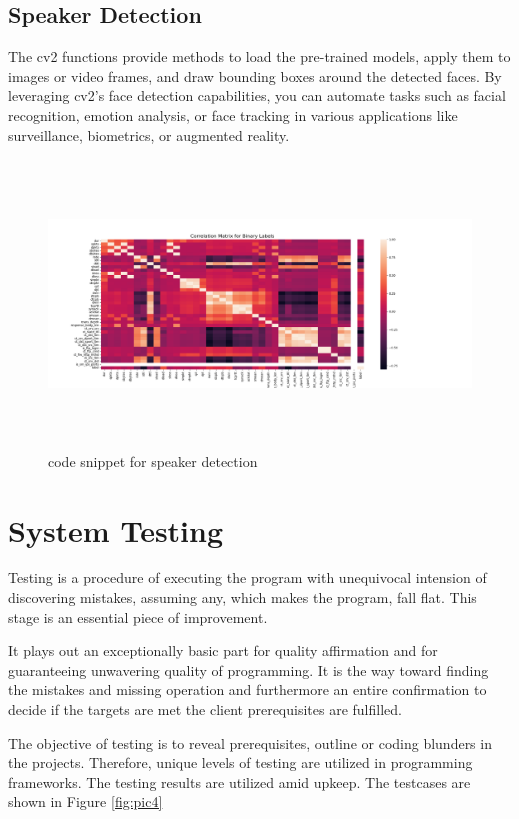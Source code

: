 \documentclass[12pt,a4paper]{report}
\begin{document}
\section{Speaker Detection}
\par The cv2 functions provide methods to load the pre-trained models, apply them to images or video frames, and draw bounding boxes around the detected faces. By leveraging cv2's face detection capabilities, you can automate tasks such as facial recognition, emotion analysis, or face tracking in various applications like surveillance, biometrics, or augmented reality.


\begin{figure}[hbtp]
\centering
\includegraphics[width=5in,height=3in]{pic/correlation_matrix_bin.png}
\caption{code snippet for speaker detection}
\end{figure}





\chapter{System Testing}
\par
Testing is a procedure of executing the program with unequivocal intension of \cite{ref4}
discovering mistakes, assuming any, which makes the program, fall flat. This stage is an
essential piece of improvement.
\par
It plays out an exceptionally basic part for quality affirmation and for guaranteeing
unwavering quality of programming. It is the way toward finding the mistakes and
missing operation and furthermore an entire confirmation to decide if the targets are met
the client prerequisites are fulfilled.
\par
The objective of testing is to reveal prerequisites, outline or coding blunders in the
projects. Therefore, unique levels of testing are utilized in programming frameworks. The
testing results are utilized amid upkeep. The testcases are shown in Figure \ref{fig:pic4}
\end{document}
